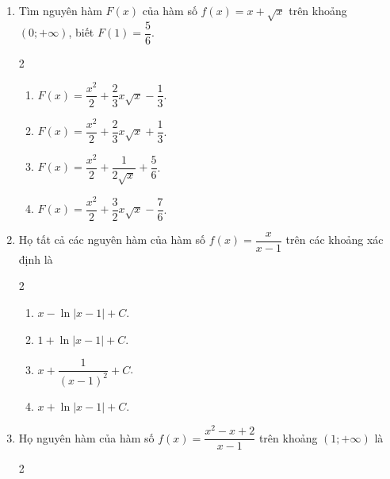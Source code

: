 \documentclass[12pt]{article}
\begin{document}
\begin{enumerate}[label=\textbf{Câu \arabic*.}]
\begin{multicols}{2}
\begin{enumerate}[label=\textbf{\Alph*.}]
				\item $\cos x + \cot x + C$.
				\item $-\cos x + \cot x + C$.
				\item $-\cos x - \cot x + C$.
				\item $\cos x - \cot x + C$.
			\end{enumerate}
		\end{multicols}
		
		\item Tìm nguyên hàm $F(x)$ của hàm số $f(x) = x + \sqrt{x}$ trên khoảng $(0; +\infty)$, biết $F(1) = \dfrac{5}{6}$.
		\begin{multicols}{2}
			\begin{enumerate}[label=\textbf{\Alph*.}]
				\item $F(x) = \dfrac{x^2}{2} + \dfrac{2}{3}x\sqrt{x} - \dfrac{1}{3}$.
				\item $F(x) = \dfrac{x^2}{2} + \dfrac{2}{3}x\sqrt{x} + \dfrac{1}{3}$.
				\item $F(x) = \dfrac{x^2}{2} + \dfrac{1}{2\sqrt{x}} + \dfrac{5}{6}$.
				\item $F(x) = \dfrac{x^2}{2} + \dfrac{3}{2}x\sqrt{x} - \dfrac{7}{6}$.
			\end{enumerate}
		\end{multicols}
		
		\item Họ tất cả các nguyên hàm của hàm số $f(x) = \dfrac{x}{x-1}$ trên các khoảng xác định là
		\begin{multicols}{2}
			\begin{enumerate}[label=\textbf{\Alph*.}]
				
				\item $x - \ln|x-1| + C$.
				\item $1 + \ln|x-1| + C$.
				\item $x + \dfrac{1}{(x-1)^2} + C$.
				\item $x + \ln|x-1| + C$.
			\end{enumerate}
		\end{multicols}
		
		\item Họ nguyên hàm của hàm số $f(x) = \dfrac{x^2 - x + 2}{x - 1}$ trên khoảng $(1; +\infty)$ là
		\begin{multicols}{2}
			\begin{enumerate}[label=\textbf{\Alph*.}]
				

\end{enumerate}
\end{multicols}
\end{enumerate}
\end{document}
